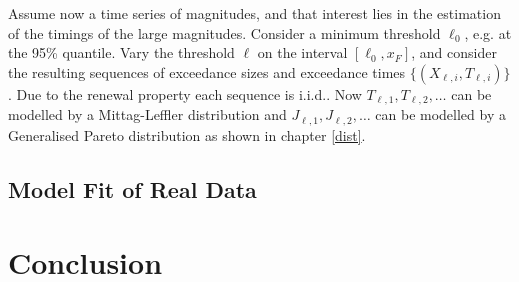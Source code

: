 \documentclass[honours,12pt]{UNSWthesis}
\newcommand{\1}{\mathbf 1}
\numberwithin{equation}{section}
\theoremstyle{definition}
\theoremstyle{remark}
\begin{document}
Assume now a time series of magnitudes, and that interest lies in the
estimation of the timings of the large magnitudes.
Consider a minimum threshold $\ell_0$, e.g. at the 95\% quantile.
Vary the threshold $\ell$ on the interval $[\ell_0, x_F]$, and consider
the resulting sequences of exceedance sizes and exceedance times 
$\{(X_{\ell,i}, T_{\ell,i})\}$. 
Due to the renewal property each sequence is i.i.d.. Now $T_{\ell,1}, T_{\ell,2}, \ldots$ can be modelled by a Mittag-Leffler distribution and $J_{\ell,1}, J_{\ell,2}, \ldots$ can be modelled by a Generalised Pareto distribution as shown in chapter \ref{dist}.
\section{Model Fit of Real Data}

\chapter{Conclusion}


\clearpage
{}


\end{document}
